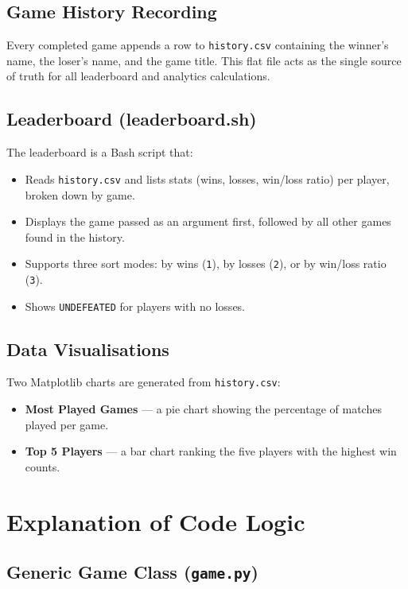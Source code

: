 \documentclass[12pt,a4paper]{article}
\begin{document}
\subsection{Game History Recording}
Every completed game appends a row to \texttt{history.csv} containing the winner's name,
the loser's name, and the game title. This flat file acts as the single source of truth for
all leaderboard and analytics calculations.

\subsection{Leaderboard (leaderboard.sh)}
The leaderboard is a Bash script that:
\begin{itemize}[leftmargin=*]
    \item Reads \texttt{history.csv} and lists stats (wins, losses, win/loss ratio) per player,
          broken down by game.
    \item Displays the game passed as an argument first, followed by all other games found in
          the history.
    \item Supports three sort modes: by wins (\texttt{1}), by losses (\texttt{2}), or by
          win/loss ratio (\texttt{3}).
    \item Shows \texttt{UNDEFEATED} for players with no losses.
\end{itemize}

\subsection{Data Visualisations}
Two Matplotlib charts are generated from \texttt{history.csv}:
\begin{itemize}[leftmargin=*]
    \item \textbf{Most Played Games} --- a pie chart showing the percentage of matches played
          per game.
    \item \textbf{Top 5 Players} --- a bar chart ranking the five players with the highest win
          counts.
\end{itemize}

\newpage
\section{Explanation of Code Logic}

\subsection{Generic Game Class (\texttt{game.py})}
\end{document}

